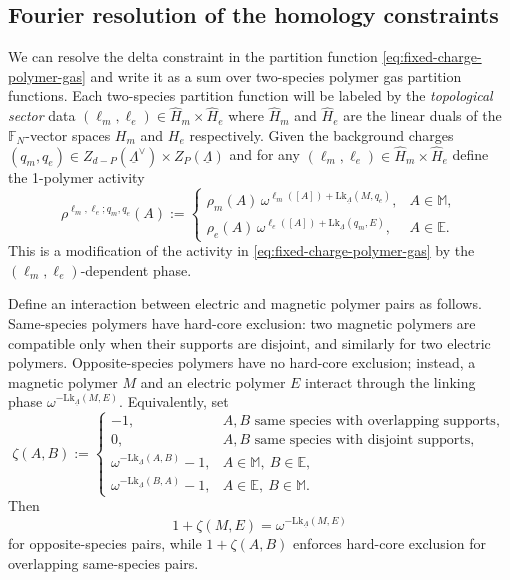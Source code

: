 \documentclass[dvipsnames,a4paper]{article}
\numberwithin{equation}{section}
\theoremstyle{definition}
\theoremstyle{remark}
\newcommand{\Lk}{\mathrm{Lk}}
\begin{document}
\subsection{Fourier resolution of the homology constraints}
\label{sec:fixed-charge-fourier-resolution}
We can resolve the delta constraint in the partition function \eqref{eq:fixed-charge-polymer-gas} and write it as a sum over two-species polymer gas partition functions. Each two-species partition function will be labeled by the \emph{topological sector} data $(\ell_m,\ell_e) \in \widehat H_m \times \widehat H_e$ where $\widehat H_m$ and $\widehat H_e$ are the linear duals of the $\mathbb F_N$-vector spaces $H_m$ and $H_e$ respectively. Given the background charges $(q_m,q_e) \in Z_{d-P}(\underline\Lambda^\vee) \times Z_P(\underline\Lambda)$ and for any $(\ell_m,\ell_e) \in \widehat H_m \times \widehat H_e$ define the 1-polymer activity
\begin{equation}
	\rho^{\ell_m,\ell_e;q_m,q_e}(A)
	:=
	\begin{cases}
		\rho_m(A)\,
		\omega^{\ell_m([A])+\Lk_{\underline\Lambda}(M,q_e)},
		& A\in \mathbb M ,
		\\
		\rho_e(A)\,
		\omega^{\ell_e([A])+\Lk_{\underline\Lambda}(q_m,E)},
		& A\in \mathbb E .
	\end{cases}
	\label{eq:fixed-background-unified-polymer-activity}
\end{equation}
This is a modification of the activity in \eqref{eq:fixed-charge-polymer-gas} by the $(\ell_m,\ell_e)$-dependent phase.

Define an interaction between electric and magnetic polymer pairs as follows. Same-species polymers have hard-core exclusion:
two magnetic polymers are compatible only when their supports are disjoint, and similarly
for two electric polymers. Opposite-species polymers have no hard-core exclusion; instead,
a magnetic polymer \(M\) and an electric polymer \(E\) interact through the linking phase
\(\omega^{-\Lk_{\underline\Lambda}(M,E)}\). Equivalently, set
\begin{equation}
	\zeta(A,B)
	:=
	\begin{cases}
		-1,
		& A,B \text{ same species with overlapping supports},
		\\
		0,
		& A,B \text{ same species with disjoint supports},
		\\
		\omega^{-\Lk_{\underline\Lambda}(A,B)}-1,
		& A\in \mathbb M ,\ B\in \mathbb E ,
		\\
		\omega^{-\Lk_{\underline\Lambda}(B,A)}-1,
		& A\in \mathbb E ,\ B\in \mathbb M .
	\end{cases}
	\label{eq:zeta}
\end{equation}
Then
\begin{equation}
	1+\zeta(M,E)=\omega^{-\Lk_{\underline\Lambda}(M,E)}
	\label{eq:MEphase}
\end{equation}
for opposite-species pairs, while \(1+\zeta(A,B)\) enforces hard-core exclusion for
overlapping same-species pairs.
\end{document}
